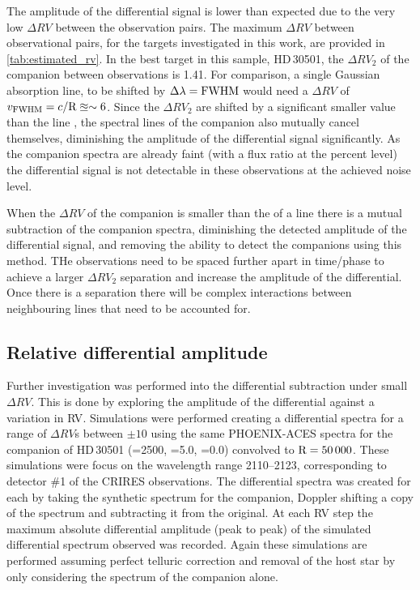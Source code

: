 The amplitude of the differential signal is lower than expected due to the very low \(\Delta {RV}\) between the observation pairs.
The maximum \(\Delta {RV}\) between observational pairs, for the targets investigated in this work, are provided in \cref{tab:estimated_rv}.
In the best target in this sample, {HD\,30501}, the \(\Delta {RV}_2\) of the companion between observations is 1.41\kmps{}.
For comparison, a single Gaussian absorption line, to be shifted by \(\Delta\lambda = {\textrm{FWHM}}\) would need a \(\Delta {RV}\) of \(v_{\textrm{FWHM}} = c/\textrm{R} \approxeq\sim6\)\kmps{}.
Since the \(\Delta {RV}_2\) are shifted by a significant smaller value than the line {\fwhm}, the spectral lines of the companion also mutually cancel themselves, diminishing the amplitude of the differential signal significantly.
As the companion spectra are already faint (with a flux ratio at the percent level) the differential signal is not detectable in these observations at the achieved noise level.

When the \(\Delta {RV}\) of the companion is smaller than the {\fwhm} of a line there is a mutual subtraction of the companion spectra, diminishing the detected amplitude of the differential signal, and removing the ability to detect the companions using this method.
THe observations need to be spaced further apart in time/phase to achieve a larger \(\Delta {RV}_2\) separation and increase the amplitude of the differential.
Once there is a separation there will be complex interactions between neighbouring lines that need to be accounted for.


\subsection{Relative differential amplitude}
\label{relative_differential_amplitue}
Further investigation was performed into the differential subtraction under small \(\Delta {RV}\).
This is done by exploring the amplitude of the differential against a variation in {RV}.
Simulations were performed creating a differential spectra for a range of \(\Delta {RV}\)s between \(\pm10\)\kmps{} using the same {PHOENIX-ACES} spectra for the companion of {HD\,30501} (\Teff{}=2500\K{}, \logg{}=5.0, \feh{}=0.0) convolved to \(\textrm{R}=50\,000\).
These simulations were focus on the wavelength range 2110--2123\nm{}, corresponding to detector \#1 of the {CRIRES} observations.
The differential spectra was created for each by taking the synthetic spectrum for the companion, Doppler shifting a copy of the spectrum and subtracting it from the original.
At each {RV} step the maximum absolute differential amplitude (peak to peak) of the simulated differential spectrum observed was recorded.
Again these simulations are performed assuming perfect telluric correction and removal of the host star by only considering the spectrum of the companion alone.

